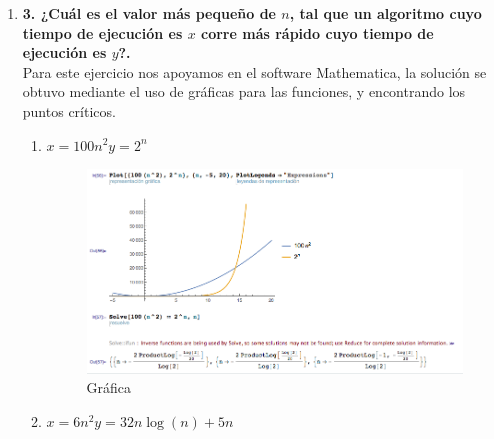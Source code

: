 \documentclass[11 pt, a4paper]{article}
\theoremstyle{definition}
\begin{document}
\begin{enumerate}
\begin{itemize}
    \end{itemize}
\item \textbf{3. ¿Cuál es el valor más pequeño de $n$, tal que un algoritmo cuyo tiempo de ejecución es $x$ corre más rápido cuyo tiempo de ejecución es $y$?.}\\
Para este ejercicio nos apoyamos en el software Mathematica, la solución se obtuvo mediante el uso de gráficas para las funciones, y encontrando los puntos críticos.\\
    \begin{enumerate}
        \item $x = 100n^2  y = 2^n$ \\
        \begin{figure}[H]
         \centering
          \includegraphics[trim=0cm 0cm 0cm 0cm, width=10cm]{3a.png} 
          \caption{Gráfica}
        \end{figure}
        \item $x = 6n^2  y = 32n\log(n)+5n$ 
    \end{enumerate}


\end{enumerate}
\end{document}
